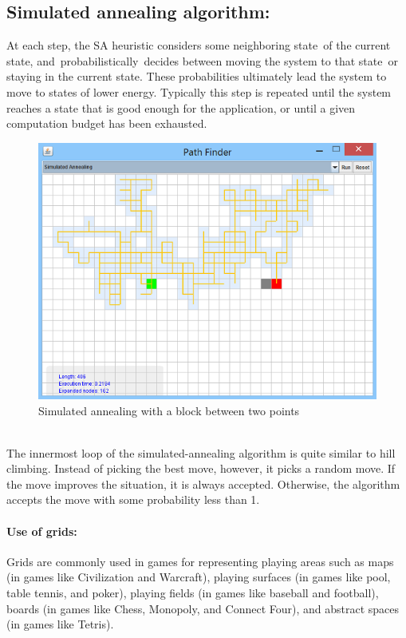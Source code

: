 \documentclass[a4paper]{article}
\begin{document}
\subsection{Simulated annealing algorithm:}

At each step, the SA heuristic considers some neighboring state of the current state, and probabilistically decides between moving the system to that state or staying in the current state. These probabilities ultimately lead the system to move to states of lower energy. Typically this step is repeated until the system reaches a state that is good enough for the application, or until a given computation budget has been exhausted. \\

\begin{figure}[h!]
  \centering
    \includegraphics[scale=.9]{images/sa1.png}
  \caption{Simulated annealing with a block between two points}
\end{figure}

\noindent \\
The innermost loop of the simulated-annealing algorithm is quite similar to hill climbing. Instead of picking the best move, however, it picks a random move. If the move improves the situation, it is always accepted. Otherwise, the algorithm accepts the move with some probability less than 1.

\paragraph{Use of grids:} Grids are commonly used in games for representing playing areas such as maps (in games like Civilization and Warcraft), playing surfaces (in games like pool, table tennis, and poker), playing fields (in games like baseball and football), boards (in games like Chess, Monopoly, and Connect Four), and abstract spaces (in games like Tetris). \\
\end{document}
